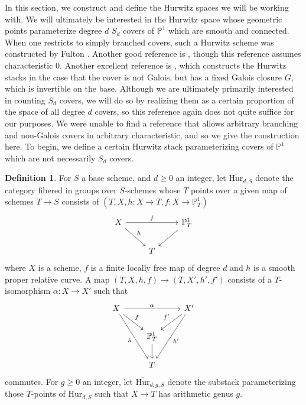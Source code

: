 \documentclass[12 pt]{amsart}
\newcommand{\rboxed}[1]{#1}
\theoremstyle{plain}
\theoremstyle{definition}
\newtheorem{definition}[theorem]{Definition}
\theoremstyle{remark}
\numberwithin{equation}{section}
\newcommand\bp{\mathbb P}
\newcommand\bighur[2]{\overline{\mathrm{Hur}}_{#1,#2}} %
\newcommand\bighurg[3]{\overline{\mathrm{Hur}}_{#1,#2, #3}} %
\begin{document}
In this section, we construct and define the Hurwitz spaces we will be working
with.
We will ultimately be interested in the Hurwitz space whose geometric points
parameterize degree $d$ $S_d$ covers of $\bp^1$ which are smooth and connected.
When one restricts to simply branched covers, such a Hurwitz scheme was constructed by Fulton
\cite{Fulton1969}.  
Another good reference is 
\cite[Theorem A]{deopurkar:compactifications-of-hurwitz-spaces}, though this
reference assumes characteristic $0$.
Another excellent reference is \cite[Thm.
6.6.6]{bertinR:champs-de-hurwitz}, which constructs the Hurwitz stacks in the
case that the cover is not Galois, but has a fixed Galois closure $G$, which is
invertible on the base. Although we are ultimately primarily interested in
counting $S_d$ covers, we will do so by realizing them as a certain proportion
of the space of all degree $d$ covers, so this reference again does not quite
suffice for our purposes.
We were unable to find a reference that allows arbitrary branching and
non-Galois covers in arbitrary characteristic, and so 
we give the construction here.  
To begin, we define a certain Hurwitz stack parameterizing covers of $\bp^1$
which are not necessarily $S_d$ covers.

\begin{definition} \label{definition:} For $S$ a base scheme, and $d \geq 0$ an
	integer, let
	$\rboxed{\bighur d S}$ denote the category fibered in groups over
	$S$-schemes whose $T$ points over a given map of schemes $T \to S$
	consists of $(T, X, h: X \to T, f: X \to \bp^1_T)$ \begin{equation}
	\label{equation:} \begin{tikzcd} X \ar {rr}{f} \ar {rd}{h} && \bp^1_T
\ar {ld} \\ & T & \end{tikzcd} \end{equation} where $X$ is a scheme, $f$ is a
finite locally free map of degree $d$ and $h$ is a smooth proper relative curve.
A map $(T, X, h, f) \to (T, X', h', f')$ consists of
a $T$-isomorphism $\alpha: X \to X'$ such that
\begin{equation} \label{equation:} \begin{tikzcd} X \ar {rr}{\alpha} \ar {rd}{f}
		\ar[bend right = 0cm, swap]{rdd}{h} && X' \ar[swap]{ld}{f'} \ar[bend
		left = 0 cm]{ldd}{h'}\\ & \bp^1_T \ar{d} &\\ & T & \end{tikzcd}\end{equation} commutes.  For $g \geq 0$
an integer, let
$\rboxed{\bighurg d g S}$ denote the substack parameterizing those $T$-points of
$\bighur d S$ such that $X \to T$ has arithmetic genus $g$.  \end{definition}
	
\end{document}

